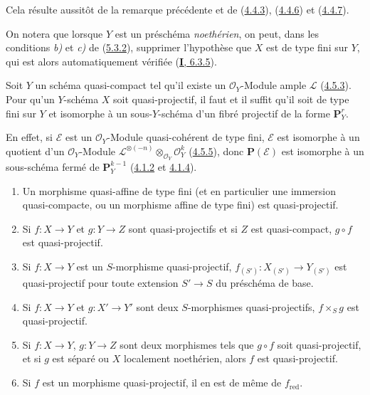 Cela résulte aussitôt de la remarque précédente et de
(\hyperref[II.4.4.3-fr]{4.4.3}), (\hyperref[II.4.4.6-fr]{4.4.6}) et
(\hyperref[II.4.4.7-fr]{4.4.7}).

On notera que lorsque $Y$ est un préschéma \emph{noethérien}, on peut, dans les
conditions \emph{b)} et \emph{c)} de (\hyperref[II.5.3.2-fr]{5.3.2}), supprimer
l'hypothèse que $X$ est de type fini sur $Y$, qui est alors automatiquement
vérifiée (\hyperref[I.6.3.5-fr]{\textbf{I}, 6.3.5}).

\begin{corollary}[5.3.3]
\label{II.5.3.3-fr}
Soit $Y$ un schéma quasi-compact tel qu'il existe un $\mathcal{O}_Y$-Module
ample $\mathcal{L}$ \textup{(\hyperref[II.4.5.3-fr]{4.5.3})}. Pour qu'un $Y$-schéma
$X$ soit quasi-projectif, il faut et il suffit qu'il soit de type fini sur
$Y$ et isomorphe à un sous-$Y$-schéma d'un fibré projectif de la forme
$\mathbf{P}_Y^r$.
\end{corollary}

En effet, si $\mathcal{E}$ est un $\mathcal{O}_Y$-Module quasi-cohérent de
type fini, $\mathcal{E}$ est isomorphe à un quotient d'un
$\mathcal{O}_Y$-Module
$\mathcal{L}^{\otimes(-n)}\otimes_{\mathcal{O}_Y}\mathcal{O}_Y^k$
(\hyperref[II.4.5.5-fr]{4.5.5}), donc $\mathbf{P}(\mathcal{E})$ est
isomorphe à un sous-schéma fermé de $\mathbf{P}_Y^{k-1}$
(\hyperref[II.4.1.2-fr]{4.1.2} et \hyperref[II.4.1.4-fr]{4.1.4}).

\begin{proposition}[5.3.4]
\label{II.5.3.4-fr}
\begin{enumerate}
  \item[\rm{(i)}] Un morphisme quasi-affine de type fini (et en particulier
  une immersion quasi-compacte, ou un morphisme affine de type fini) est
  quasi-projectif.
  \item[\rm{(ii)}] Si $f:X\to Y$ et $g:Y\to Z$ sont quasi-projectifs et si
  $Z$ est quasi-compact, $g\circ f$ est quasi-projectif.


  \item[\rm{(iii)}] Si $f:X\to Y$ est un $S$-morphisme quasi-projectif,
  $f_{(S')}:X_{(S')}\to Y_{(S')}$ est quasi-projectif pour toute extension
  $S'\to S$ du préschéma de base.
  \item[\rm{(iv)}] Si $f:X\to Y$ et $g:X'\to Y'$ sont deux $S$-morphismes
  quasi-projectifs, $f\times_Sg$ est quasi-projectif.
  \item[\rm{(v)}] Si $f:X\to Y$, $g:Y\to Z$ sont deux morphismes tels que
  $g\circ f$ soit quasi-projectif, et si $g$ est séparé ou $X$ localement
  noethérien, alors $f$ est quasi-projectif.
  \item[\rm{(vi)}] Si $f$ est un morphisme quasi-projectif, il en est de
  même de $f_{\mathrm{red}}$.
\end{enumerate}
\end{proposition}

